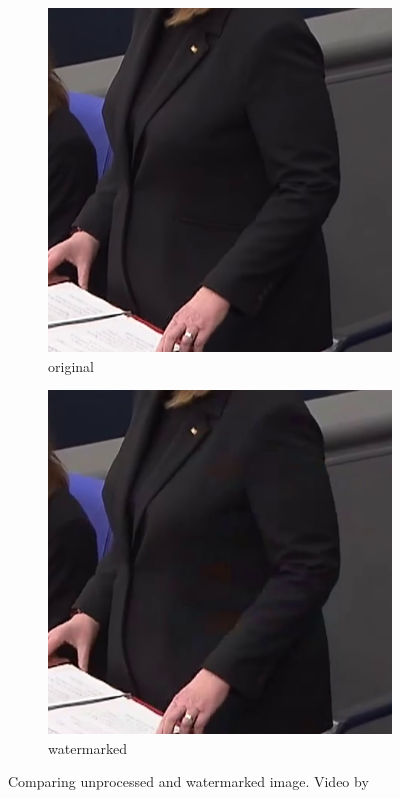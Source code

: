 \documentclass[12pt, technote]{IEEEtran}
\begin{document}
\begin{figure}[t]
    \centering
    \begin{subfigure}[b]{0.48\textwidth}
        \centering
        \includegraphics[width=\textwidth]{imgs/unprocessed_crop.png}
        \caption{original}
        \label{fig:dark1}
    \end{subfigure}
    \begin{subfigure}[b]{0.48\textwidth}
        \centering
        \includegraphics[width=\textwidth]{imgs/processed_crop.png}
        \caption{watermarked}
        \label{fig:dark2}
    \end{subfigure}
    \hfill
    \caption{Comparing unprocessed and watermarked image. Video by\cite{archiveTagesschauUhr}}
    \label{fig:dark}
\end{figure}
\end{document}
